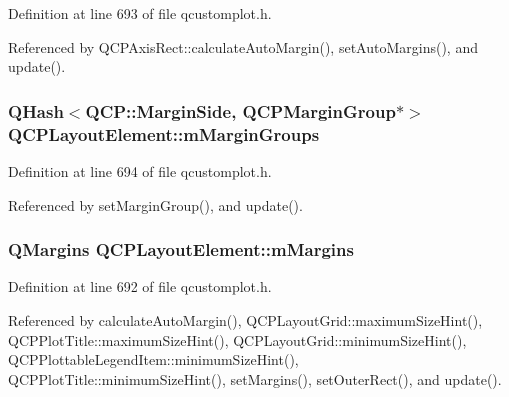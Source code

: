 Definition at line 693 of file qcustomplot.\+h.



Referenced by Q\+C\+P\+Axis\+Rect\+::calculate\+Auto\+Margin(), set\+Auto\+Margins(), and update().

\hypertarget{class_q_c_p_layout_element_aeafbbc1130e02eee663c5326761fc963}{}
\subsubsection[{m\+Margin\+Groups}]{\setlength{\rightskip}{0pt plus 5cm}Q\+Hash$<${\bf Q\+C\+P\+::\+Margin\+Side}, {\bf Q\+C\+P\+Margin\+Group}$\ast$$>$ Q\+C\+P\+Layout\+Element\+::m\+Margin\+Groups\hspace{0.3cm}{\ttfamily [protected]}}\label{class_q_c_p_layout_element_aeafbbc1130e02eee663c5326761fc963}


Definition at line 694 of file qcustomplot.\+h.



Referenced by set\+Margin\+Group(), and update().

\hypertarget{class_q_c_p_layout_element_ac2a32b99ee527ca5dfff9da03628fe94}{}
\subsubsection[{m\+Margins}]{\setlength{\rightskip}{0pt plus 5cm}Q\+Margins Q\+C\+P\+Layout\+Element\+::m\+Margins\hspace{0.3cm}{\ttfamily [protected]}}\label{class_q_c_p_layout_element_ac2a32b99ee527ca5dfff9da03628fe94}


Definition at line 692 of file qcustomplot.\+h.



Referenced by calculate\+Auto\+Margin(), Q\+C\+P\+Layout\+Grid\+::maximum\+Size\+Hint(), Q\+C\+P\+Plot\+Title\+::maximum\+Size\+Hint(), Q\+C\+P\+Layout\+Grid\+::minimum\+Size\+Hint(), Q\+C\+P\+Plottable\+Legend\+Item\+::minimum\+Size\+Hint(), Q\+C\+P\+Plot\+Title\+::minimum\+Size\+Hint(), set\+Margins(), set\+Outer\+Rect(), and update().

\hypertarget{class_q_c_p_layout_element_a64a387973fd4addac842028c89088998}{}
